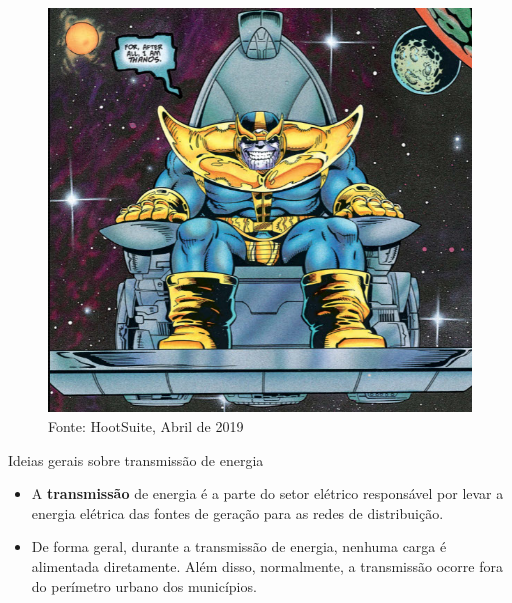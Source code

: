 \begin{frame}{}
	\begin{figure}
		\caption{}
		\includegraphics[width = 0.65\linewidth]{img/lorem-picsum.jpg}\\
		\tiny Fonte: HootSuite, Abril de 2019
	\end{figure}
\end{frame}

\begin{frame}{Ideias gerais sobre transmissão de energia}
	\begin{itemize}
		\item<1-> A \textbf{transmissão} de energia é a parte do setor elétrico responsável por levar a energia elétrica das fontes de geração para as redes de distribuição. 
		\item De forma geral, durante a transmissão de energia, nenhuma carga é alimentada diretamente. Além disso, normalmente, a transmissão ocorre fora do perímetro urbano dos municípios.
		\end{itemize} 
\end{frame}


